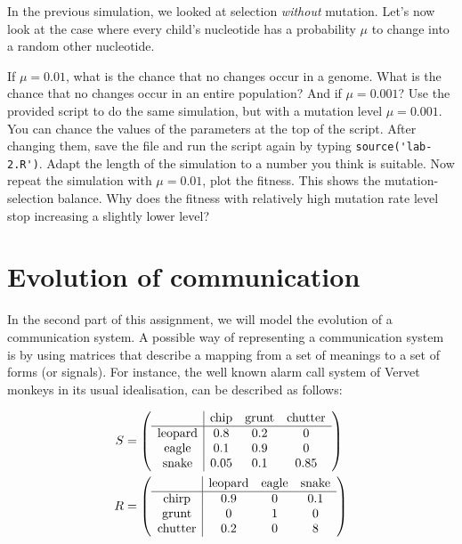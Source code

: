 \documentclass[a4paper, 9pt]{article}
\begin{document}
In the previous simulation, we looked at selection \textit{without}
mutation. Let's now look at the case where every child's nucleotide has
a probability $\mu$ to change into a random other nucleotide.

\begin{exercise}
    \ask If $\mu=0.01$, what is the chance that no changes occur in a genome. What is the chance that no changes occur in an entire population? And if $\mu=0.001$?
    \action Use the provided script to do the same simulation, but with a mutation level $\mu=0.001$. You can chance the values of the parameters at the top of the script. After changing them, save the file and run the script again by typing \verb|source('lab-2.R')|. Adapt the length of the simulation to a number you think is suitable.
    \action Now repeat the simulation with $\mu=0.01$, plot the fitness. This shows the mutation-selection balance.
    \askstar Why does the fitness with relatively high mutation rate level stop increasing a slightly lower level?
\end{exercise}

\section{Evolution of communication}\label{evolution-of-communication}

In the second part of this assignment, we will model the evolution of a
communication system. A possible way of representing a communication
system is by using matrices that describe a mapping from a set of
meanings to a set of forms (or signals). For instance, the well known
alarm call system of Vervet monkeys \cite{seyfarth1980monkey} in its
usual idealisation, can be described as follows:

\begin{align*}\footnotesize
S &=
  \left(
  \begin{array}{c|ccc}
  & \text{chip} & \text{grunt} & \text{chutter}\\
  \hline
  \text{leopard} & 0.8 & 0.2 & 0\\
  \text{eagle} & 0.1 & 0.9 & 0\\
  \text{snake} & 0.05 & 0.1 & 0.85 \\
  \end{array}
  \right)
  \\
R &=
  \left(
  \begin{array}{c|ccc}
  & \text{leopard} & \text{eagle} & \text{snake}\\
  \hline
  \text{chirp} & 0.9 & 0 & 0.1\\
  \text{grunt} & 0 & 1 & 0\\
  \text{chutter} & 0.2 & 0 & 8\\
  \end{array}
  \right)
\end{align*}
\end{document}
